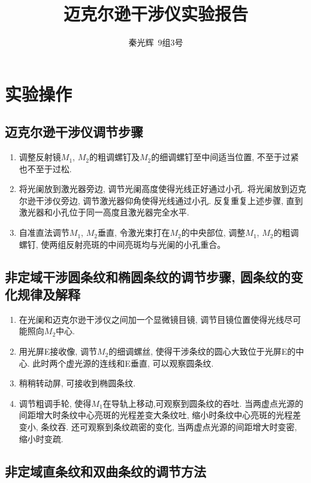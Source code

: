\documentclass[a4paper,10pt,notitlepage]{article}
\begin{document}
\title{迈克尔逊干涉仪实验报告}
\author{秦光辉\ 9组3号}
\maketitle

\section{实验操作}

\subsection{迈克尔逊干涉仪调节步骤}

\begin{enumerate}
	\item 调整反射镜$M_1$, $M_2$的粗调螺钉及$M_2$的细调螺钉至中间适当位置, 不至于过紧也不至于过松.
	\item 将光阑放到激光器旁边, 调节光阑高度使得光线正好通过小孔. 将光阑放到迈克尔逊干涉仪旁边, 调节激光器仰角使得光线通过小孔. 反复重复上述步骤, 直到激光器和小孔位于同一高度且激光器完全水平.
	\item 自准直法调节$M_1$, $M_2$垂直, 令激光束打在$M_2$的中央部位, 调整$M_1$, $M_2$的粗调螺钉, 使两组反射亮斑的中间亮斑均与光阑的小孔重合。
\end{enumerate}

\subsection{非定域干涉圆条纹和椭圆条纹的调节步骤, 圆条纹的变化规律及解释}

\begin{enumerate}
	\item 在光阑和迈克尔逊干涉仪之间加一个显微镜目镜, 调节目镜位置使得光线尽可能照向$M_2$中心.
	\item 用光屏E接收像, 调节$M_2$的细调螺丝, 使得干涉条纹的圆心大致位于光屏E的中心. 此时两个虚光源的连线和E垂直, 可以观察圆条纹.
	\item 稍稍转动屏, 可接收到椭圆条纹.
	\item 调节粗调手轮, 使得$M_1$在导轨上移动,可观察到圆条纹的吞吐. 当两虚点光源的间距增大时条纹中心亮斑的光程差变大条纹吐, 缩小时条纹中心亮斑的光程差变小, 条纹吞. 还可观察到条纹疏密的变化, 当两虚点光源的间距增大时变密, 缩小时变疏. 
\end{enumerate}

\subsection{非定域直条纹和双曲条纹的调节方法}
\end{document}
